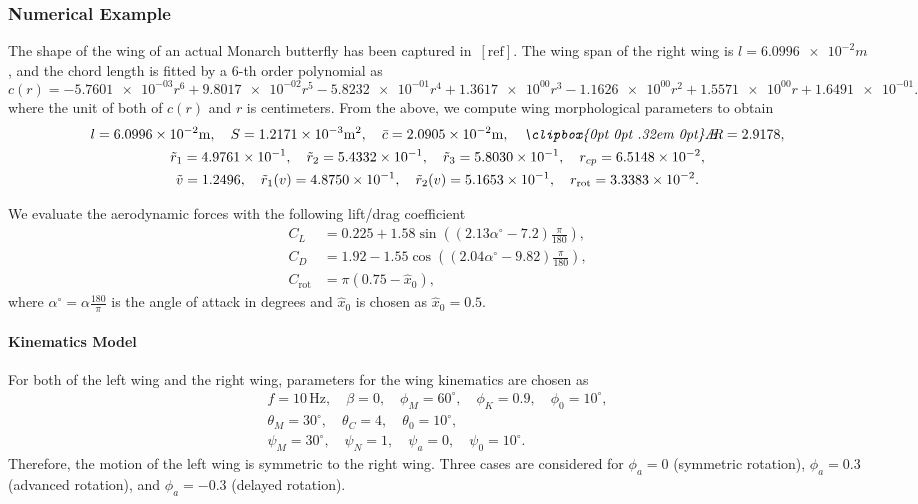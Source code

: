 \documentclass[10pt,draft]{article}
\def\AR{\text{\itshape\clipbox{0pt 0pt .32em 0pt}\AE\kern-.30emR}}
\newcommand{\rot}{\ensuremath{\mathrm{rot}}}
\begin{document}
\subsubsection{Numerical Example}

The shape of the wing of an actual Monarch butterfly has been captured in~$[\mathrm{ref}]$. 
The wing span of the right wing is $l=\num{6.0996e-2}\si{m}$, and
the chord length is fitted by a $6$-th order polynomial as
\[
    c(r) = \num{-5.7601e-03} r^6 + \num{9.8017e-02} r^5 -\num{5.8232e-01} r^4 + \num{1.3617e+00} r^3  - \num{1.1626e+00} r^2  + \num{1.5571e+00} r + \num{1.6491e-01}.
\]
where the unit of both of $c(r)$ and $r$ is centimeters. 
From the above, we compute wing morphological parameters to obtain
\begin{gather*}
    l=\num{6.0996e-2}\si{m},\quad
    S=\num{1.2171e-03}\si{m^2},\quad
    \bar c=\num{2.0905e-02}\si{m},\quad
    \AR = \num{2.9178e+00},\\
    \tilde r_1= \num{4.9761e-01},\quad
    \tilde r_2 = \num{5.4332e-01},\quad
    \tilde r_3 = \num{5.8030e-01},\quad
    r_{cp} = \num{6.5148e-02},\\
    \tilde v = \num{1.2496e+00},\quad
    \tilde r_1(v) = \num{4.8750e-01},\quad
    \tilde r_2(v) = \num{5.1653e-01},\quad
    r_\rot = \num{3.3383e-02}.
\end{gather*}

We evaluate the aerodynamic forces with the following lift/drag coefficient~\cite{sane2002aerodynamic}
\begin{align*}
    C_L & = 0.225 + 1.58 \sin( (2.13\alpha^\circ - 7.2) \frac{\pi}{180}),\\
    C_D & = 1.92 - 1.55 \cos( (2.04 \alpha^\circ - 9.82 ) \frac{\pi}{180}),\\
    C_\rot &  = \pi(0.75 - \hat x_0),
\end{align*}
where $\alpha^\circ = \alpha \frac{180}{\pi}$ is the angle of attack in degrees and $\hat x_0$ is chosen as $\hat x_0=0.5$. 

\paragraph{Kinematics Model~\cite{berman2007energy}}

For both of the left wing and the right wing, parameters for the wing kinematics are chosen as
\begin{gather*}
    f=10\,\mathrm{Hz},\quad \beta=0,\quad \phi_M=60^\circ, \quad \phi_K=0.9, \quad \phi_0 = 10^\circ,\\
    \theta_M = 30^\circ, \quad \theta_C = 4, \quad \theta_0 = 10^\circ,\\
    \psi_M=30^\circ, \quad \psi_N=1, \quad \psi_a=0,\quad \psi_0=10^\circ.
\end{gather*}
Therefore, the motion of the left wing is symmetric to the right wing.
Three cases are considered for $\phi_a=0$ (symmetric rotation), $\phi_a=0.3$ (advanced rotation), and $\phi_a=-0.3$ (delayed rotation).
\end{document}
